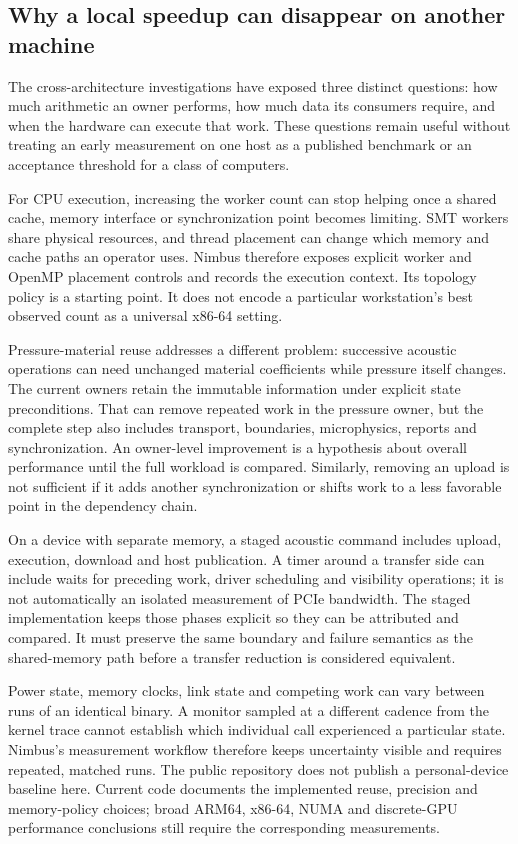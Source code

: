 \subsection{Why a local speedup can disappear on another machine}

The cross-architecture investigations have exposed three distinct questions:
how much arithmetic an owner performs, how much data its consumers require,
and when the hardware can execute that work. These questions remain useful
without treating an early measurement on one host as a published benchmark or
an acceptance threshold for a class of computers.

For CPU execution, increasing the worker count can stop helping once a shared
cache, memory interface or synchronization point becomes limiting. SMT workers
share physical resources, and thread placement can change which memory and
cache paths an operator uses. Nimbus therefore exposes explicit worker and
OpenMP placement controls and records the execution context. Its topology
policy is a starting point. It does not encode a particular workstation's
best observed count as a universal x86-64 setting.

Pressure-material reuse addresses a different problem: successive acoustic
operations can need unchanged material coefficients while pressure itself
changes. The current owners retain the immutable information under explicit
state preconditions. That can remove repeated work in the pressure owner, but
the complete step also includes transport, boundaries, microphysics, reports
and synchronization. An owner-level improvement is a hypothesis about overall
performance until the full workload is compared. Similarly, removing an upload
is not sufficient if it adds another synchronization or shifts work to a less
favorable point in the dependency chain.

On a device with separate memory, a staged acoustic command includes upload,
execution, download and host publication. A timer around a transfer side can
include waits for preceding work, driver scheduling and visibility operations;
it is not automatically an isolated measurement of PCIe bandwidth. The staged
implementation keeps those phases explicit so they can be attributed and
compared. It must preserve the same boundary and failure semantics as the
shared-memory path before a transfer reduction is considered equivalent.

Power state, memory clocks, link state and competing work can vary between
runs of an identical binary. A monitor sampled at a different cadence from the
kernel trace cannot establish which individual call experienced a particular
state. Nimbus's measurement workflow therefore keeps uncertainty visible and
requires repeated, matched runs. The public repository does not publish a
personal-device baseline here. Current code documents the implemented reuse,
precision and memory-policy choices; broad ARM64, x86-64, NUMA and discrete-GPU
performance conclusions still require the corresponding measurements.

